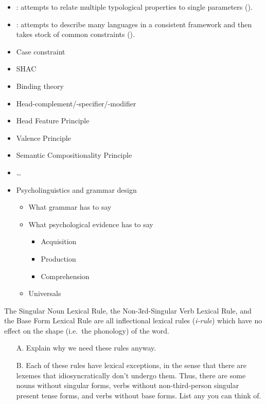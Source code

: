 \documentclass[a4paper,landscape,headrule,footrule,dvips]{foils}
\begin{document}

\begin{itemize}
\item {}: attempts to relate multiple 
typological properties to single parameters ().
\item {}: attempts to 
describe many languages in a consistent 
framework and then takes stock of common 
constraints ().
\end{itemize}

\begin{itemize}
\item Case constraint
\item SHAC
\item Binding theory
\item Head-complement/-specifier/-modifier
\item Head Feature Principle
\item Valence Principle
\item Semantic Compositionality Principle
\item \ldots{}
\end{itemize}

\begin{itemize}
\item Psycholinguistics and grammar design
  \begin{itemize}
  \item What grammar has to say
  \item What psychological evidence has to say
    \begin{itemize}
    \item Acquisition
    \item Production
    \item Comprehension
    \end{itemize}
  \item Universals
  \end{itemize}
\end{itemize}



The Singular Noun Lexical Rule, the Non-3rd-Singular Verb Lexical
Rule, and the Base Form Lexical Rule are all inflectional lexical
rules ({\it i-rule}) which have no effect on the shape (i.e.\ the
phonology) of the word.

\begin{itemize}
\item[A.] Explain why we need these rules anyway.  
\item[B.] Each of these rules have lexical exceptions, in the sense
that there are lexemes that idiosyncratically don't undergo them.
Thus, there are some nouns without singular forms, verbs without
non-third-person singular present tense forms, and verbs without base
forms.  List any you can think of. 
\end{itemize}


\end{document}
